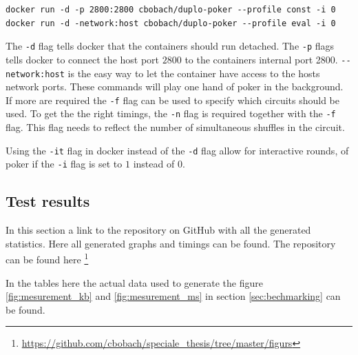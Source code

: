 \documentclass[twoside,11pt,openright]{report}
\begin{document}
\begin{appendices}
\begin{center}
\begin{verbatim}
docker run -d -p 2800:2800 cbobach/duplo-poker --profile const -i 0
docker run -d -network:host cbobach/duplo-poker --profile eval -i 0
\end{verbatim}
\end{center}

The \verb|-d| flag tells docker that the containers should run detached. The \verb|-p| flags tells docker to connect the host port $2800$ to the containers internal port 2800. \verb|--network:host| is the easy way to let the container have access to the hosts network ports. These commands will play one hand of poker in the background. If more are required the \verb|-f| flag can be used to specify which circuits should be used. To get the the right timings, the \verb|-n| flag is required together with the \verb|-f| flag. This flag needs to reflect the number of simultaneous shuffles in the circuit.

Using the \verb|-it| flag in docker instead of the \verb|-d| flag allow for interactive rounds, of poker if the \verb|-i| flag is set to $1$ instead of $0$.


\subsection{Test results}
\label{app:test-res}
In this section a link to the repository on GitHub with all the generated statistics. Here all generated graphs and timings can be found. The repository can be found here \footnote{\url{https://github.com/cbobach/speciale_thesis/tree/master/figurs}}

\bigskip

In the tables here the actual data used to generate the figure \ref{fig:mesurement_kb} and \ref{fig:mesurement_ms} in section \ref{sec:bechmarking} can be found.

\begin{table}
\centering

    \begin{subtable}{\textwidth}
    \label{table:const_kb}
    \centering
    \caption{$Constructor$}
    \end{subtable}%
    

\end{table}
\end{appendices}
\end{document}
